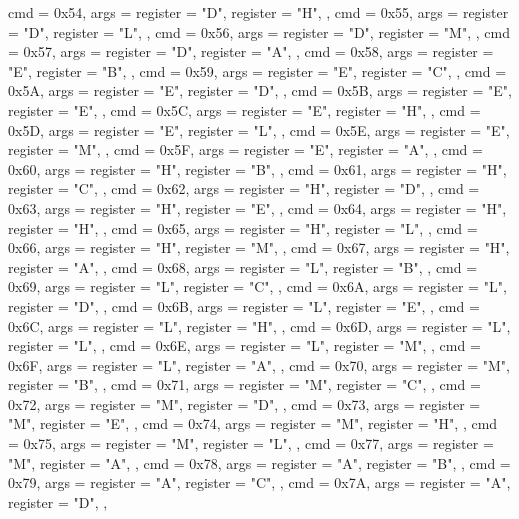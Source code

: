 {{        { cmd = 0x54, args = {{register = "D"}, {register = "H"}}, },
        { cmd = 0x55, args = {{register = "D"}, {register = "L"}}, },
        { cmd = 0x56, args = {{register = "D"}, {register = "M"}}, },
        { cmd = 0x57, args = {{register = "D"}, {register = "A"}}, },
        { cmd = 0x58, args = {{register = "E"}, {register = "B"}}, },
        { cmd = 0x59, args = {{register = "E"}, {register = "C"}}, },
        { cmd = 0x5A, args = {{register = "E"}, {register = "D"}}, },
        { cmd = 0x5B, args = {{register = "E"}, {register = "E"}}, },
        { cmd = 0x5C, args = {{register = "E"}, {register = "H"}}, },
        { cmd = 0x5D, args = {{register = "E"}, {register = "L"}}, },
        { cmd = 0x5E, args = {{register = "E"}, {register = "M"}}, },
        { cmd = 0x5F, args = {{register = "E"}, {register = "A"}}, },
        { cmd = 0x60, args = {{register = "H"}, {register = "B"}}, },
        { cmd = 0x61, args = {{register = "H"}, {register = "C"}}, },
        { cmd = 0x62, args = {{register = "H"}, {register = "D"}}, },
        { cmd = 0x63, args = {{register = "H"}, {register = "E"}}, },
        { cmd = 0x64, args = {{register = "H"}, {register = "H"}}, },
        { cmd = 0x65, args = {{register = "H"}, {register = "L"}}, },
        { cmd = 0x66, args = {{register = "H"}, {register = "M"}}, },
        { cmd = 0x67, args = {{register = "H"}, {register = "A"}}, },
        { cmd = 0x68, args = {{register = "L"}, {register = "B"}}, },
        { cmd = 0x69, args = {{register = "L"}, {register = "C"}}, },
        { cmd = 0x6A, args = {{register = "L"}, {register = "D"}}, },
        { cmd = 0x6B, args = {{register = "L"}, {register = "E"}}, },
        { cmd = 0x6C, args = {{register = "L"}, {register = "H"}}, },
        { cmd = 0x6D, args = {{register = "L"}, {register = "L"}}, },
        { cmd = 0x6E, args = {{register = "L"}, {register = "M"}}, },
        { cmd = 0x6F, args = {{register = "L"}, {register = "A"}}, },
        { cmd = 0x70, args = {{register = "M"}, {register = "B"}}, },
        { cmd = 0x71, args = {{register = "M"}, {register = "C"}}, },
        { cmd = 0x72, args = {{register = "M"}, {register = "D"}}, },
        { cmd = 0x73, args = {{register = "M"}, {register = "E"}}, },
        { cmd = 0x74, args = {{register = "M"}, {register = "H"}}, },
        { cmd = 0x75, args = {{register = "M"}, {register = "L"}}, },
        { cmd = 0x77, args = {{register = "M"}, {register = "A"}}, },
        { cmd = 0x78, args = {{register = "A"}, {register = "B"}}, },
        { cmd = 0x79, args = {{register = "A"}, {register = "C"}}, },
        { cmd = 0x7A, args = {{register = "A"}, {register = "D"}}, },
}}
